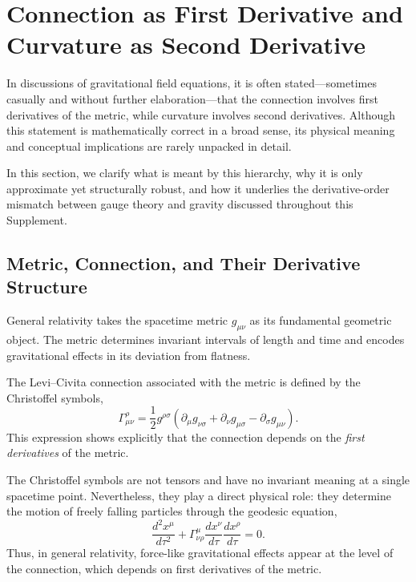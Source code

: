 \documentclass[12pt,letterpaper]{article}
\begin{document}
\section{Connection as First Derivative and Curvature as Second Derivative}

\justifying
In discussions of gravitational field equations, it is often stated---sometimes casually and without further elaboration---that the connection involves first derivatives of the metric, while curvature involves second derivatives.
Although this statement is mathematically correct in a broad sense, its physical meaning and conceptual implications are rarely unpacked in detail.

In this section, we clarify what is meant by this hierarchy, why it is only approximate yet structurally robust, and how it underlies the derivative-order mismatch between gauge theory and gravity discussed throughout this Supplement.

\subsection{Metric, Connection, and Their Derivative Structure}

General relativity takes the spacetime metric $g_{\mu\nu}$ as its fundamental geometric object.
The metric determines invariant intervals of length and time and encodes gravitational effects in its deviation from flatness.

The Levi--Civita connection associated with the metric is defined by the Christoffel symbols,
\begin{equation}
\Gamma^\rho_{\mu\nu}
=
\frac{1}{2}
g^{\rho\sigma}
\left(
\partial_\mu g_{\nu\sigma}
+
\partial_\nu g_{\mu\sigma}
-
\partial_\sigma g_{\mu\nu}
\right).
\end{equation}
This expression shows explicitly that the connection depends on the \emph{first derivatives} of the metric.

The Christoffel symbols are not tensors and have no invariant meaning at a single spacetime point.
Nevertheless, they play a direct physical role: they determine the motion of freely falling particles through the geodesic equation,
\begin{equation}
\frac{d^2 x^\mu}{d\tau^2}
+
\Gamma^\mu_{\nu\rho}
\frac{dx^\nu}{d\tau}
\frac{dx^\rho}{d\tau}
= 0.
\end{equation}
Thus, in general relativity, force-like gravitational effects appear at the level of the connection, which depends on first derivatives of the metric.
\end{document}
